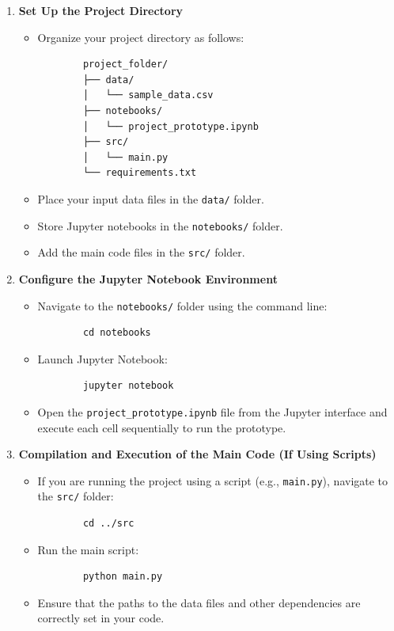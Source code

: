 \begin{enumerate}
    \item \textbf{Set Up the Project Directory}
    \begin{itemize}
        \item Organize your project directory as follows:
        \begin{verbatim}
        project_folder/
        ├── data/
        │   └── sample_data.csv
        ├── notebooks/
        │   └── project_prototype.ipynb
        ├── src/
        │   └── main.py
        └── requirements.txt
        \end{verbatim}
        \item Place your input data files in the \texttt{data/} folder.
        \item Store Jupyter notebooks in the \texttt{notebooks/} folder.
        \item Add the main code files in the \texttt{src/} folder.
    \end{itemize}

    \item \textbf{Configure the Jupyter Notebook Environment}
    \begin{itemize}
        \item Navigate to the \texttt{notebooks/} folder using the command line:
        \begin{verbatim}
        cd notebooks
        \end{verbatim}
        \item Launch Jupyter Notebook:
        \begin{verbatim}
        jupyter notebook
        \end{verbatim}
        \item Open the \texttt{project\_prototype.ipynb} file from the Jupyter interface and execute each cell sequentially to run the prototype.
    \end{itemize}

    \item \textbf{Compilation and Execution of the Main Code (If Using Scripts)}
    \begin{itemize}
        \item If you are running the project using a script (e.g., \texttt{main.py}), navigate to the \texttt{src/} folder:
        \begin{verbatim}
        cd ../src
        \end{verbatim}
        \item Run the main script:
        \begin{verbatim}
        python main.py
        \end{verbatim}
        \item Ensure that the paths to the data files and other dependencies are correctly set in your code.
    \end{itemize}


\end{enumerate}
